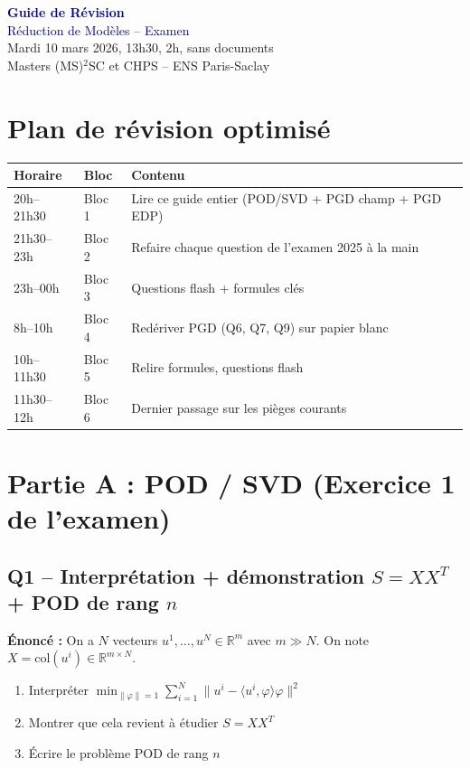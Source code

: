 \documentclass[11pt,a4paper]{article}
\begin{document}
\begin{center}
{\Huge\bfseries\textcolor{darkblue}{Guide de R\'evision}}\\[0.3cm]
{\LARGE\textcolor{darkblue}{R\'eduction de Mod\`eles -- Examen}}\\[0.5cm]
{\large Mardi 10 mars 2026, 13h30, 2h, sans documents}\\[0.3cm]
{\large Masters (MS)$^2$SC et CHPS -- ENS Paris-Saclay}
\end{center}
\vspace{0.5cm}

\section{Plan de r\'evision optimis\'e}

\begin{center}
\begin{tabular}{@{}lll@{}}
\toprule
\textbf{Horaire} & \textbf{Bloc} & \textbf{Contenu} \\
\midrule
20h--21h30 & Bloc 1 & Lire ce guide entier (POD/SVD + PGD champ + PGD EDP) \\
21h30--23h & Bloc 2 & Refaire chaque question de l'examen 2025 \`a la main \\
23h--00h & Bloc 3 & Questions flash + formules cl\'es \\
8h--10h & Bloc 4 & Red\'eriver PGD (Q6, Q7, Q9) sur papier blanc \\
10h--11h30 & Bloc 5 & Relire formules, questions flash \\
11h30--12h & Bloc 6 & Dernier passage sur les pi\`eges courants \\
\bottomrule
\end{tabular}
\end{center}

\section{Partie A : POD / SVD (Exercice 1 de l'examen)}

\subsection{Q1 -- Interpr\'etation + d\'emonstration $S=XX^T$ + POD de rang $n$}

\textbf{\'Enonc\'e :} On a $N$ vecteurs $u^1,\ldots,u^N \in \mathbb{R}^m$ avec $m \gg N$. On note $X = \text{col}(u^i) \in \mathbb{R}^{m\times N}$.
\begin{enumerate}
\item Interpr\'eter $\displaystyle\min_{\|\varphi\|=1} \sum_{i=1}^{N} \|u^i - \langle u^i,\varphi\rangle\varphi\|^2$
\item Montrer que cela revient \`a \'etudier $S = XX^T$
\item \'Ecrire le probl\`eme POD de rang $n$
\end{enumerate}
\end{document}
